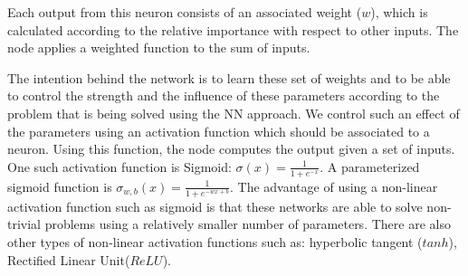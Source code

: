 Each output from this neuron consists of an associated weight ($w$), which is calculated according to the relative importance with respect to other inputs. The node applies a weighted function to the sum of inputs.

The intention behind the network is to learn these set of weights and to be able to control the strength and the influence of these parameters according to the problem that is being solved using the NN approach. We control such an effect of the parameters using an activation function which should be associated to a neuron. Using this function, the node computes the output given a set of inputs. One such activation function is Sigmoid: $\sigma(x) = \frac{1}{1+e^{-x}}$. A parameterized sigmoid function is $\sigma_{w,b}(x) = \frac{1}{1+e^{-wx+b}}$. The advantage of using a non-linear activation function such as sigmoid is that these networks are able to solve non-trivial problems using a relatively smaller number of parameters. 
There are also other types of non-linear activation functions such as: hyperbolic tangent  ($tanh$), Rectified Linear Unit($ReLU$). 

